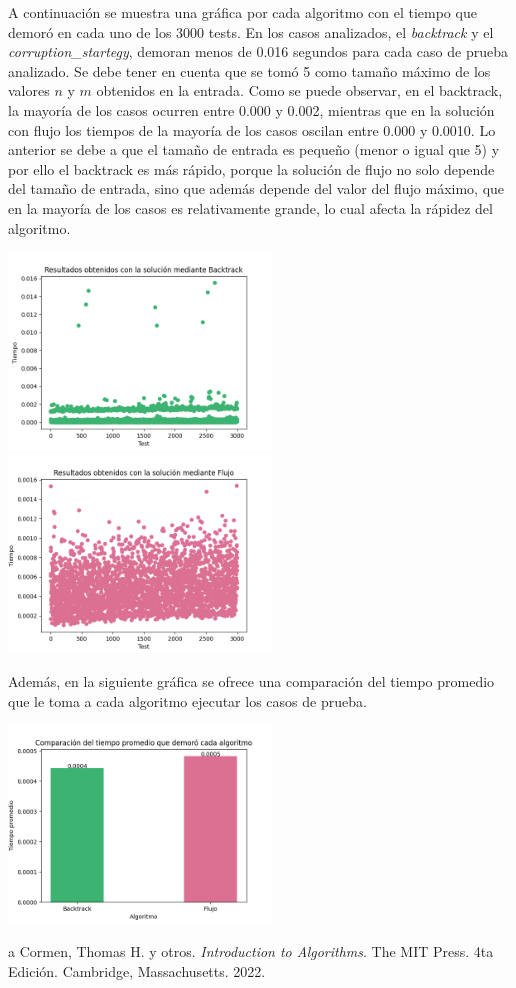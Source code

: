 \documentclass[10pt]{article} %
\begin{document}
	A continuaci\'on se muestra una gr\'afica por cada algoritmo con el tiempo que demor\'o en cada uno de los 3000 tests. En los casos analizados, el \textit{backtrack} y el \textit{corruption\_startegy}, demoran menos de 0.016 segundos para cada caso de prueba analizado. Se debe tener en cuenta que se tom\'o 5 como tama\~no m\'aximo de los valores $n$ y $m$ obtenidos en la entrada. Como se puede observar, en el backtrack, la mayor\'ia de los casos ocurren entre 0.000 y 0.002, mientras que en la soluci\'on con flujo los tiempos de la mayor\'ia de los casos oscilan entre 0.000 y 0.0010. Lo anterior se debe a que el tama\~no de entrada es peque\~no (menor o igual que 5) y por ello el backtrack es m\'as r\'apido, porque la soluci\'on de flujo no solo depende del tama\~no de entrada, sino que adem\'as depende del valor del flujo m\'aximo, que en la mayor\'ia de los casos es relativamente grande, lo cual afecta la r\'apidez del algoritmo.
	
	\begin{center}
		\includegraphics[width=7cm]{Backtrack_results.png}
		\includegraphics[width=7cm]{Flujo_results.png}
	\end{center}  
	
	Adem\'as, en la siguiente gr\'afica se ofrece una comparaci\'on del tiempo promedio que le toma a cada algoritmo ejecutar los casos de prueba. 
	
	\begin{center}
		\includegraphics[width=7cm]{Bar_comparative_plot.png}
	\end{center}
	
	\begin{thebibliography}
		a
		 Cormen, Thomas H. y otros. \emph{Introduction to Algorithms}. 
		The MIT Press.
		4ta Edici\'on.		
		Cambridge, Massachusetts.
		2022.
	\end{thebibliography}
\end{document}
